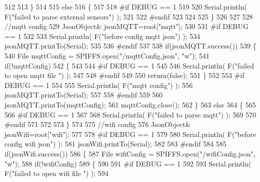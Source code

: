 \begin{DoxyCode}
512 
513     \}
514 
515     \textcolor{keywordflow}{else}
516     \{   
517 
518 \textcolor{preprocessor}{    #if DEBUG == 1}
519         
520         Serial.println( F(\textcolor{stringliteral}{"failed to parse external sensors"}) );
521 
522 \textcolor{preprocessor}{    #endif}
523 
524 
525     \}
526 
527     
528     \textcolor{comment}{//mqtt config}
529         JsonObject& jsonMQTT=root[\textcolor{stringliteral}{"mqtt"}];
530     
531 \textcolor{preprocessor}{#if DEBUG == 1 }
532 
533     Serial.println( F(\textcolor{stringliteral}{"before config mqtt json"}) );
534     jsonMQTT.printTo(Serial);
535 
536 \textcolor{preprocessor}{#endif}
537 
538     \textcolor{keywordflow}{if}(jsonMQTT.success())
539     \{
540         File mqttConfig = SPIFFS.open(\textcolor{stringliteral}{"/mqttConfig.json"}, \textcolor{stringliteral}{"w"}); 
541         \textcolor{keywordflow}{if}(!mqttConfig)
542         \{
543         
544 \textcolor{preprocessor}{        #if DEBUG == 1 }
545 
546             Serial.println( F(\textcolor{stringliteral}{"failed to open mqtt file "}) );
547         
548 \textcolor{preprocessor}{        #endif}
549         
550             \textcolor{keywordflow}{return}(\textcolor{keyword}{false});
551         \}
552 
553 \textcolor{preprocessor}{#if DEBUG == 1 }
554 
555         Serial.println( F(\textcolor{stringliteral}{"mqtt config"}) );
556         jsonMQTT.printTo(Serial);
557 
558 \textcolor{preprocessor}{#endif}
559     
560         jsonMQTT.printTo(mqttConfig);
561         mqttConfig.close();
562     \}
563     \textcolor{keywordflow}{else}
564     \{
565 
566 \textcolor{preprocessor}{    #if DEBUG == 1 }
567 
568         Serial.println( F(\textcolor{stringliteral}{"failed to parse mqtt"}) );
569     
570 \textcolor{preprocessor}{    #endif}
571 
572     
573     \}   
574 
575     \textcolor{comment}{//wifi config}
576         JsonObject& jsonWifi=root[\textcolor{stringliteral}{"wifi"}];
577     
578 \textcolor{preprocessor}{#if DEBUG == 1 }
579 
580     Serial.println( F(\textcolor{stringliteral}{"before config wifi json"}) );
581     jsonWifi.printTo(Serial);
582 
583 \textcolor{preprocessor}{#endif}
584 
585     \textcolor{keywordflow}{if}(jsonWifi.success())
586     \{
587         File wifiConfig = SPIFFS.open(\textcolor{stringliteral}{"/wifiConfig.json"}, \textcolor{stringliteral}{"w"}); 
588         \textcolor{keywordflow}{if}(!wifiConfig)
589         \{
590         
591 \textcolor{preprocessor}{        #if DEBUG == 1 }
592 
593             Serial.println( F(\textcolor{stringliteral}{"failed to open wifi file "}) );
594         

\end{DoxyCode}
